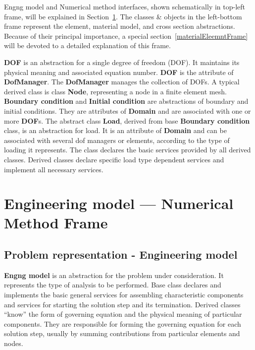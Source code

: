 \documentclass[a4paper]{article}
\newcommand{\class}[1]{{\bf #1}}
\begin{document}
Engng model and Numerical method interfaces, shown schematically in
top-left frame, will be explained in
Section~\ref{engngNummetsection}. The classes \& objects in the left-bottom frame represent the element,
material model, and cross section abstractions. Because of their
principal importance, a special 
section~\ref{materialEleemntFrame} will be devoted to a detailed
explanation of this frame. 

\class{DOF} is an abstraction for a single degree of freedom (DOF). It maintains
its physical meaning and associated equation number. \class{DOF} is
the attribute of \class{DofManager}. The \class{DofManager} manages the collection
of DOFs. A typical
derived class is class \class{Node}, representing a node in a finite element mesh.
\class{Boundary condition} and \class{Initial condition} are abstractions of boundary and
initial conditions. They are attributes of \class{Domain} and are associated
with one or more \class{DOF}s. The abstract class \class{Load}, derived from base \class{Boundary
condition} class, is an abstraction for load. It is an attribute of \class{Domain}
and can be associated with several dof managers or elements, according to
the type of loading it represents. The class declares the basic services provided by
all derived classes. Derived classes declare specific load type dependent
services and implement all necessary services.



\section {Engineering model --- Numerical Method Frame}
\label{engngNummetsection}

\subsection{Problem representation - Engineering model}
\class{Engng model} is an abstraction for the problem under
consideration. It represents the type of analysis to be performed.
Base class declares and implements the basic general services for assembling
characteristic components and services for starting the solution step and
its termination. Derived classes ``know'' the form of governing
equation and the physical meaning of  particular components. 
They are responsible for forming the governing equation for each solution
step,  usually by summing contributions from particular elements and
nodes.
\end{document}
